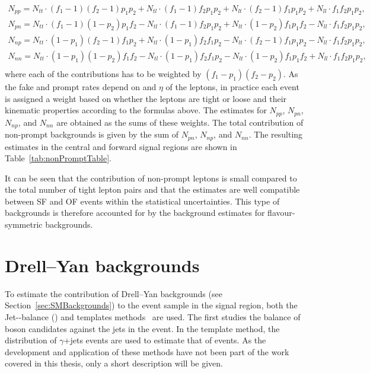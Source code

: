 \begin{eqnarray*}
N_{pp} = N_{tt}\cdot(f_1 -1)(f_2-1)p_1p_2 + N_{tl}\cdot(f_1 -1)f_2p_1p_2 + N_{lt}\cdot (f_2-1)f_1p_1p_2 + N_{ll}\cdot f_1f_2p_1p_2,\\
N_{pn} = N_{tt}\cdot(f_1 -1)(1-p_2)p_1f_2 - N_{tl}\cdot(f_1 -1)f_2p_1p_2 + N_{lt}\cdot (1-p_2)f_1p_1f_2 - N_{ll}\cdot f_1f_2p_1p_2,\\
N_{np} = N_{tt}\cdot(1 - p_1)(f_2 - 1)f_1p_2 + N_{tl}\cdot(1-p_1)f_2f_1p_2 - N_{lt}\cdot (f_2-1)f_1p_1p_2 - N_{ll}\cdot f_1f_2p_1p_2,\\
N_{nn} = N_{tt}\cdot(1-p_1)(1-p_2)f_1f_2 - N_{tl}\cdot (1-p_1)f_2f_1p_2 - N_{lt}\cdot (1-p_2)f_1p_1f_2 + N_{ll}\cdot f_1f_2p_1p_2,\\
\end{eqnarray*}
where each of the contributions has to be weighted by $(f_1-p_1)(f_2-p_2)$. As the fake and prompt rates depend on \pt and $\eta$ of the leptons, in practice each event is assigned a weight based on whether the leptons are tight or loose and their kinematic properties according to the formulas above. The estimates for $N_{pp}$, $N_{pn}$, $N_{np}$, and $N_{nn}$ are obtained as the sums of these weights. The total contribution of non-prompt backgrounds is given by the sum of $N_{pn}$, $N_{np}$, and $N_{nn}$. The resulting estimates in the central and forward signal regions are shown in Table~\ref{tab:nonPromptTable}. 

It can be seen that the contribution of non-prompt leptons is small compared to the total number of tight lepton pairs and that the estimates are well compatible between SF and OF events within the statistical uncertainties. This type of backgrounds is therefore accounted for by the background estimates for flavour-symmetric backgrounds.

\section{Drell--Yan backgrounds}
To estimate the contribution of Drell--Yan backgrounds (see Section~\ref{sec:SMBackgrounds}) to the event sample in the signal region, both the Jet-\Z-balance (\JZB) and \MET templates methods~\cite{Chatrchyan:2012qka} are used. The first studies the balance of \Z boson candidates against the jets in the event. In the \MET template method, the \MET distribution of $\gamma$+jets events are used to estimate that of \zjets events. As the development and application of these methods have not been part of the work covered in this thesis, only a short description will be given.
